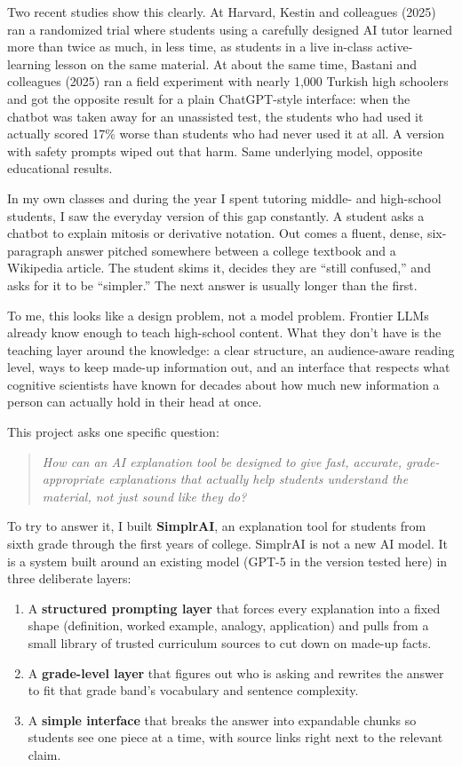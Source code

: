\documentclass[11pt,letterpaper]{article}
\begin{document}
Two recent studies show this clearly. At Harvard, Kestin and colleagues (2025)
ran a randomized trial where students using a carefully designed AI tutor
learned more than twice as much, in less time, as students in a live in-class
active-learning lesson on the same material. At about the same time, Bastani
and colleagues (2025) ran a field experiment with nearly 1,000 Turkish high
schoolers and got the opposite result for a plain ChatGPT-style interface: when
the chatbot was taken away for an unassisted test, the students who had used
it actually scored 17\% worse than students who had never used it at all. A
version with safety prompts wiped out that harm. Same underlying model,
opposite educational results.

In my own classes and during the year I spent tutoring middle- and high-school
students, I saw the everyday version of this gap constantly. A student asks a
chatbot to explain mitosis or derivative notation. Out comes a fluent, dense,
six-paragraph answer pitched somewhere between a college textbook and a
Wikipedia article. The student skims it, decides they are ``still confused,''
and asks for it to be ``simpler.'' The next answer is usually longer than the
first.

To me, this looks like a design problem, not a model problem. Frontier LLMs
already know enough to teach high-school content. What they don't have is the
teaching layer around the knowledge: a clear structure, an audience-aware
reading level, ways to keep made-up information out, and an interface that
respects what cognitive scientists have known for decades about how much new
information a person can actually hold in their head at once.

This project asks one specific question:
\begin{quote}\itshape
How can an AI explanation tool be designed to give fast, accurate,
grade-appropriate explanations that actually help students understand the
material, not just sound like they do?
\end{quote}

To try to answer it, I built \textbf{SimplrAI}, an explanation tool for students
from sixth grade through the first years of college. SimplrAI is not a new AI
model. It is a system built around an existing model (GPT-5 in the version
tested here) in three deliberate layers:
\begin{enumerate}[leftmargin=1.4em,itemsep=0.15em,topsep=0.2em]
  \item A \textbf{structured prompting layer} that forces every explanation
  into a fixed shape (definition, worked example, analogy, application) and
  pulls from a small library of trusted curriculum sources to cut down on
  made-up facts.
  \item A \textbf{grade-level layer} that figures out who is asking and
  rewrites the answer to fit that grade band's vocabulary and sentence
  complexity.
  \item A \textbf{simple interface} that breaks the answer into expandable
  chunks so students see one piece at a time, with source links right next
  to the relevant claim.
\end{enumerate}
\end{document}
